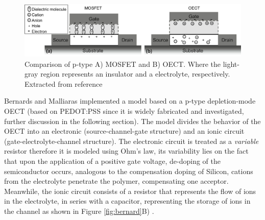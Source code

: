 \begin{figure}[h]
  \centering
  \includegraphics[width=\textwidth]{Images/pdf/MOSFETvsOECTs.pdf}
  \caption[Device physics of MOSFET vs OECT]{Comparison of p-type A) MOSFET and B) OECT. Where the light-gray region represents an insulator and a electrolyte, respectively. Extracted from reference  \cite{friedleinDevicePhysicsOrganic2018}}
  \label{fig:vsMOS}
\end{figure}

Bernards and Malliaras implemented a model based on a p-type depletion-mode OECT (based on PEDOT:PSS since it is widely fabricated and investigated, further discussion in the following section). The model divides the behavior of the OECT into an electronic (source-channel-gate structure) and an ionic circuit (gate-electrolyte-channel structure). The electronic circuit is treated as a \textit{variable} resistor therefore it is modeled using Ohm's law, its variability lies on the fact that upon the application of a positive gate voltage, de-doping of the semiconductor occurs, analogous to the compensation doping of Silicon, cations from the electrolyte penetrate the polymer, compensating one acceptor. Meanwhile, the ionic circuit consists of a resistor that represents the flow of ions in the electrolyte, in series with a capacitor, representing the storage of ions in the channel as shown in Figure \ref{fig:bernard}B)  \cite{rivnayOrganicElectrochemicalTransistors2018}\cite{bernardsSteadyStateTransientBehavior2007}. 


